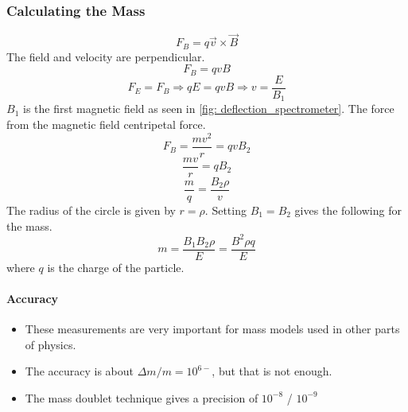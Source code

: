 \subsubsection{Calculating the Mass}
\begin{equation}
F_{B} = q \vec{v} × \vec{B} 
\end{equation}
The field and velocity are perpendicular.
\begin{equation}
F_{B} = qvB
\end{equation}
\begin{equation}
F_E = F_B ⇒ qE = qvB ⇒ v = \frac{E}{B_1}
\end{equation}
$B_1$ is the first magnetic field as seen in \cref{fig: deflection_spectrometer}. The force from the magnetic field centripetal force. 
\begin{equation}
F_B = \frac{mv^2}{r} = qvB_2
\end{equation}
\begin{equation}
\frac{mv}{r} = qB_2
\end{equation}
\begin{equation}  
\frac{m}{q} = \frac{B_2ρ}{v}
\end{equation}
The radius of the circle is given by $r = ρ$. Setting $B_1 = B_2$ gives the following for the mass.
\begin{equation}
m = \frac{B_1 B_2 ρ}{E} = \frac{B^2 ρq}{E}
\end{equation}
where $q$ is the charge of the particle.

\paragraph{Accuracy}
\begin{itemize}
    \item These measurements are very important for mass models used in other parts of physics. 
    \item The accuracy is about $Δm / m = 10^{6-}$, but that is not enough. 
    \item The mass doublet technique gives a precision of $10^{-8}$ / $10^{-9}$
\end{itemize}






